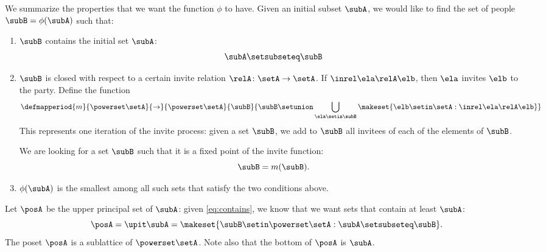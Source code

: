 We summarize the properties that we want the function $\phi$ to have.
Given an initial subset $\subA$, we would like to find the set of people $\subB = \phi(\subA)$ such that:
\begin{enumerate}
    \item $\subB$ contains the initial set $\subA$:
          \begin{equation}
              \label{eq:contains}
              \subA \setsubseteq \subB
          \end{equation}
    \item $\subB$ is closed with respect to a certain invite relation $\relA \colon \setA \to \setA$.
          If $\inrel \ela \relA \elb$, then $\ela$ invites $\elb$ to the party.
          Define the function
          \begin{equation}
              \defmapperiod{m}{\powerset \setA}{\to}{\powerset \setA
              }{
                  \subB
              }{
                  \subB \setunion \bigcup_{\ela \setin \subB} \makeset{ \elb \setin \setA : \inrel \ela \relA \elb}
              }
          \end{equation}
          This represents one iteration of the invite process: given a set $\subB$, we add to $\subB$ all invitees of each of the elements of $\subB$.

          We are looking for a set $\subB$ such that it is a fixed point of the invite function:
          \begin{equation}
              \subB = m(\subB).
          \end{equation}

    \item $\phi(\subA)$ is the smallest among all such sets that satisfy the two conditions above.
\end{enumerate}

Let $\posA$ be the upper principal set of $\subA$: given \cref{eq:contains}, we know that we want sets that contain at least $\subA$:
\begin{equation}
    \posA = \upit \subA  = \makeset{ \subB \setin \powerset \setA : \subA \setsubseteq \subB }.
\end{equation}
The poset $\posA$ is a sublattice of $\powerset \setA$.
Note also that the bottom of $\posA$ is $\subA$.

